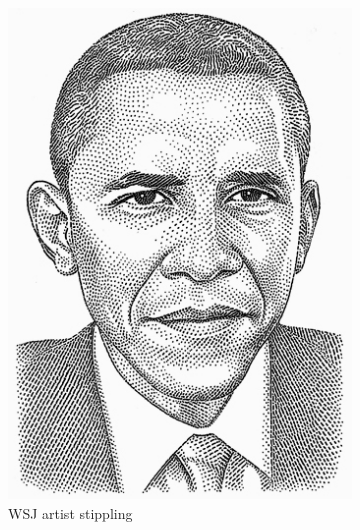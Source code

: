 \documentclass[11pt]{article}
\begin{document}
\begin{enumerate}
\begin{figure}[H]
\begin{subfigure}{0.4\textwidth}
        \includegraphics[width=\textwidth]{figs/wsj-obama.jpg}
 \caption{WSJ artist stippling}
    \end{subfigure}
    \begin{subfigure}{0.4\textwidth}
        \centering

\end{subfigure}
\end{figure}
\end{enumerate}
\end{document}
